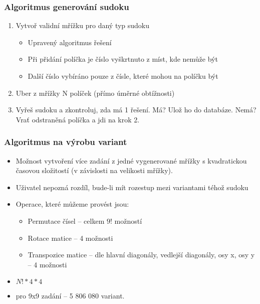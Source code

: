 \documentclass[aspectratio=43]{beamer}
\begin{document}
\begin{frame}[fragile]
	\frametitle{Algoritmus generování sudoku}
		\begin{enumerate}
			\item Vytvoř validní mřížku pro daný typ sudoku 
			\begin{itemize}
				\item Upravený algoritmus řešení
				\item Při přidání políčka je číslo vyškrtnuto z míst, kde nemůže být
				\item Další číslo vybíráno pouze z čísle, které mohou na políčku být
			\end{itemize}
			\item Uber z mřížky N políček (přímo úměrné obtížnosti)
			\item Vyřeš sudoku a zkontroluj, zda má 1 řešení. Má? Ulož ho do 
			databáze. Nemá? Vrať odstraněná políčka a jdi na krok 2.
		\end{enumerate}
\end{frame}

\begin{frame}[fragile]
	\frametitle{Algoritmus na výrobu variant}
	\begin{itemize}
		\item Možnost vytvoření více zadání z jedné vygenerované mřížky s 
		kvadratickou časovou složitostí (v závislosti na velikosti mřížky).
		\item Uživatel nepozná rozdíl, bude-li mít rozestup mezi variantami téhož 
		sudoku
		\item Operace, které můžeme provést jsou:
		\begin{itemize}
		   \item Permutace čísel -- celkem $9!$ možností
		   \item Rotace matice -- 4 možnosti
		   \item Transpozice matice -- dle hlavní diagonály, vedlejší diagonály, 
		   osy x, osy y -- 4 možnosti
		\end{itemize}
		\item $N! * 4 * 4$
		\item pro 9x9 zadání -- 5 806 080 variant.
	\end{itemize}
\end{frame}
\end{document}
